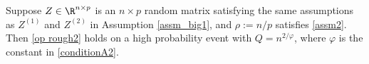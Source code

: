 \documentclass[aos,preprint]{imsart}
\begin{document}
\begin{corollary}\label{fact_minv}
Suppose $Z\in \R^{n\times p}$ is an $n\times p$ random matrix satisfying the same assumptions as $Z^{(1)}$ and $Z^{(2)}$ in Assumption \ref{assm_big1}, and $\rho:=n/p$ satisfies \eqref{assm2}. Then \eqref{op rough2} holds on a high probability event with $Q=n^{2/\varphi}$, where $\varphi$ is the constant in \eqref{conditionA2}.
\end{corollary}
\end{document}
